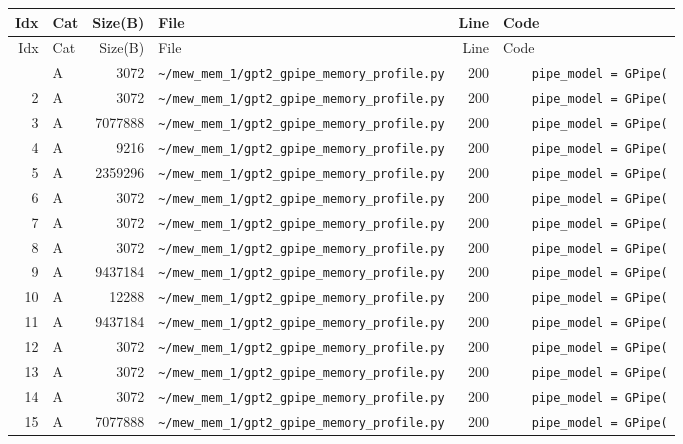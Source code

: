 \documentclass{article}
\begin{document}
\begin{longtable}{r l r p{6.5cm} r p{7.0cm}}
\hline
Idx & Cat & Size(B) & File & Line & Code \\
\hline
\endfirsthead
\hline
Idx & Cat & Size(B) & File & Line & Code \\
\hline
\endhead
\hline
\endfoot
1 & A & 3072 & \lstinline|~/mew_mem_1/gpt2_gpipe_memory_profile.py| & 200 & \lstinline|    pipe_model = GPipe(| \\
2 & A & 3072 & \lstinline|~/mew_mem_1/gpt2_gpipe_memory_profile.py| & 200 & \lstinline|    pipe_model = GPipe(| \\
3 & A & 7077888 & \lstinline|~/mew_mem_1/gpt2_gpipe_memory_profile.py| & 200 & \lstinline|    pipe_model = GPipe(| \\
4 & A & 9216 & \lstinline|~/mew_mem_1/gpt2_gpipe_memory_profile.py| & 200 & \lstinline|    pipe_model = GPipe(| \\
5 & A & 2359296 & \lstinline|~/mew_mem_1/gpt2_gpipe_memory_profile.py| & 200 & \lstinline|    pipe_model = GPipe(| \\
6 & A & 3072 & \lstinline|~/mew_mem_1/gpt2_gpipe_memory_profile.py| & 200 & \lstinline|    pipe_model = GPipe(| \\
7 & A & 3072 & \lstinline|~/mew_mem_1/gpt2_gpipe_memory_profile.py| & 200 & \lstinline|    pipe_model = GPipe(| \\
8 & A & 3072 & \lstinline|~/mew_mem_1/gpt2_gpipe_memory_profile.py| & 200 & \lstinline|    pipe_model = GPipe(| \\
9 & A & 9437184 & \lstinline|~/mew_mem_1/gpt2_gpipe_memory_profile.py| & 200 & \lstinline|    pipe_model = GPipe(| \\
10 & A & 12288 & \lstinline|~/mew_mem_1/gpt2_gpipe_memory_profile.py| & 200 & \lstinline|    pipe_model = GPipe(| \\
11 & A & 9437184 & \lstinline|~/mew_mem_1/gpt2_gpipe_memory_profile.py| & 200 & \lstinline|    pipe_model = GPipe(| \\
12 & A & 3072 & \lstinline|~/mew_mem_1/gpt2_gpipe_memory_profile.py| & 200 & \lstinline|    pipe_model = GPipe(| \\
13 & A & 3072 & \lstinline|~/mew_mem_1/gpt2_gpipe_memory_profile.py| & 200 & \lstinline|    pipe_model = GPipe(| \\
14 & A & 3072 & \lstinline|~/mew_mem_1/gpt2_gpipe_memory_profile.py| & 200 & \lstinline|    pipe_model = GPipe(| \\
15 & A & 7077888 & \lstinline|~/mew_mem_1/gpt2_gpipe_memory_profile.py| & 200 & \lstinline|    pipe_model = GPipe(| \\

\end{longtable}
\end{document}
